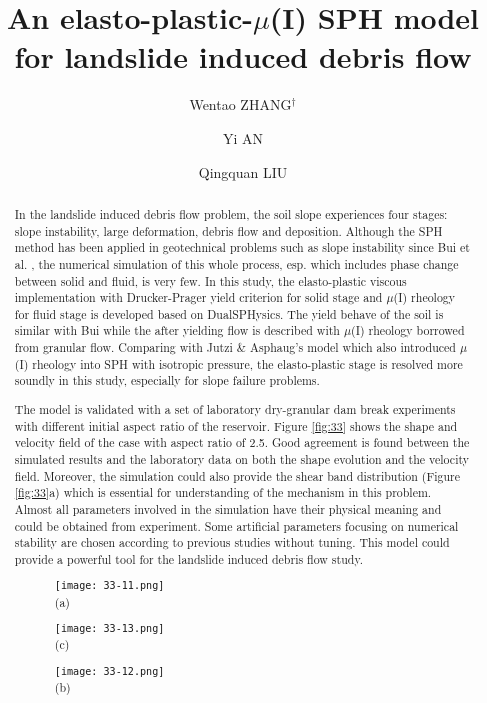 \documentclass[10pt]{article}
\title{An elasto-plastic-$\mu$(I) SPH model for landslide induced debris flow}
\date{}
\author[1]{Wentao ZHANG$^\dagger$}
\author[1]{Yi AN}
\affil[1]{Institute of Mechanics, Chinese Academy of Sciences, P.R. China}
\author[2]{Qingquan LIU}
\affil[1]{Beijing Institute of Technology, P.R. China}
\affil[$\relax$]{\email{\dagger}{zhangwentao@imech.ac.cn}}
\begin{document}
\maketitle


\begin{abstract}
 In the landslide induced debris flow problem, the soil slope experiences four stages: slope instability, large deformation, debris flow and deposition. Although the SPH method has been applied in geotechnical problems such as slope instability since Bui et al. \cite{bui2008lagrangian}, the numerical simulation of this whole process, esp. which includes phase change between solid and fluid, is very few. In this study, the elasto-plastic viscous implementation with Drucker-Prager yield criterion for solid stage and $\mu$(I) rheology for fluid stage is developed based on DualSPHysics. The yield behave of the soil is similar with Bui \cite{bui2008lagrangian} while the after yielding flow is described with $\mu$(I) rheology borrowed from granular flow. Comparing with Jutzi \& Asphaug's model \cite{jutzi2011mega} which also introduced $\mu$(I) rheology into SPH with isotropic pressure, the elasto-plastic stage is resolved more soundly in this study, especially for slope failure problems. 

The model is validated with a set of laboratory dry-granular dam break experiments with different initial aspect ratio of the reservoir. Figure \ref{fig:33} shows the shape and velocity field of the case with aspect ratio of 2.5. Good agreement is found between the simulated results and the laboratory data on both the shape evolution and the velocity field. Moreover, the simulation could also provide the shear band distribution (Figure \ref{fig:33}a) which is essential for understanding of the mechanism in this problem. Almost all parameters involved in the simulation have their physical meaning and could be obtained from experiment. Some artificial parameters focusing on numerical stability are chosen according to previous studies without tuning. This model could provide a powerful tool for the landslide induced debris flow study.

\begin{figure}[!htb]
\begin{minipage}[b]{0.5\linewidth}
\centering
\texttt{[image: 33-11.png]}\\ (a)

\texttt{[image: 33-13.png]}\\ (c)
\end{minipage}
\begin{minipage}[b]{0.5\linewidth}
\centering
\texttt{[image: 33-12.png]}\\ (b)


\end{minipage}
\end{figure}
\end{abstract}
\end{document}
